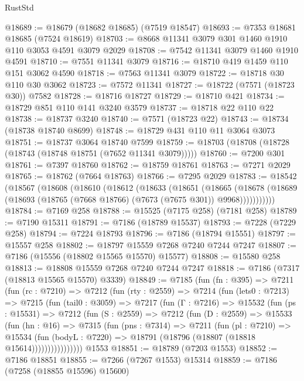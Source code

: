 \begin{lexlean}{RustStd}
\begin{coremodule}
@18689 := @18679 (@18682 @18685) (@7519 @18547)
@18693 := @7353 @18681 @18685 (@7524 @18619)
@18703 := @8668 @11341 @3079 @301 @1460 @1910 @110 @3053 @4591 @3079 @2029
@18708 := @7542 @11341 @3079 @1460 @1910 @4591
@18710 := @7551 @11341 @3079
@18716 := @18710 @419 @1459 @110 @151 @3062 @4590
@18718 := @7563 @11341 @3079
@18722 := @18718 @30 @110 @30 @3062
@18723 := @7572 @11341
@18727 := @18722 (@7571 (@18723 @30)) @7582
@18728 := @18716 @18727
@18729 := @18710 @421
@18734 := @18729 @851 @110 @141 @3240 @3579
@18737 := @18718 @22 @110 @22
@18738 := @18737 @3240
@18740 := @7571 (@18723 @22)
@18743 := @18734 (@18738 @18740 @8699)
@18748 := @18729 @431 @110 @11 @3064 @3073
@18751 := @18737 @3064 @18740 @7599
@18759 := @18703 (@18708 (@18728 (@18743 (@18748 @18751 (@7652 @11341 @3079)))))
@18760 := @7200 @301
@18761 := @7397 @18760
@18762 := @18759 @18761
@18763 := @7271 @2029
@18765 := @18762 (@7664 @18763)
@18766 := @7295 @2029
@18783 := @18542
    (@18567
      (@18608
        (@18610
          (@18612
            (@18633
              (@18651
                (@18665
                  (@18678
                    (@18689 (@18693 (@18765 (@7668 @18766) (@7673 (@7675 @301)) @9968)))))))))))
@18784 := @7169 @258
@18788 := @15525 (@7175 @258) (@7181 @258)
@18789 := @7190 @15311
@18791 := @7186 (@18789 @15537)
@18793 := @7228 (@7229 @258)
@18794 := @7224 @18793
@18796 := @7186 (@18794 @15551)
@18797 := @15557 @258
@18802 := @18797 @15559 @7268 @7240 @7244 @7247
@18807 := @7186 (@15556 (@18802 @15565 @15570) @15577)
@18808 := @15580 @258
@18813 := @18808 @15559 @7268 @7240 @7244 @7247
@18818 := @7186 (@7317 (@18813 @15565 @15570) @3339)
@18849 := @7185
    (fun (fn : @395) =>
    @7211
      (fun (rc : @7210) =>
      @7212
        (fun (rty : @2559) =>
        @7214
          (fun (lets0 : @7213) =>
          @7215
            (fun (tail0 : @3059) =>
            @7217
              (fun (Γ : @7216) =>
              @15532
                (fun (ps : @15531) =>
                @7212
                  (fun (S : @2559) =>
                  @7212
                    (fun (D : @2559) =>
                    @15533
                      (fun (hn : @16) =>
                      @7315
                        (fun (pns : @7314) =>
                        @7211
                          (fun (pl : @7210) =>
                          @15534
                            (fun (bodyL : @7220) =>
                            @18791 (@18796 (@18807 (@18818 @15614))))))))))))))))
    @1553
@18851 := @18789 (@7203 @1553)
@18852 := @7186 @18851
@18855 := @7266 (@7267 @1553) @15314
@18859 := @7186 (@7258 (@18855 @15596) @15600)

\end{coremodule}
\end{lexlean}
